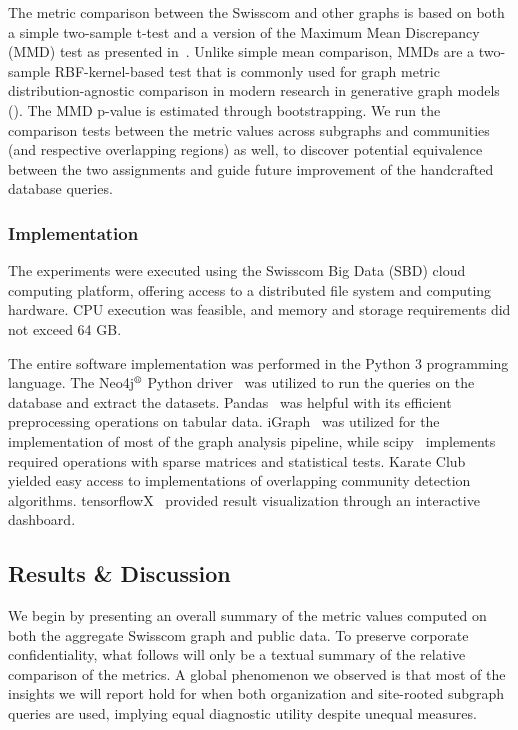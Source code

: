 The metric comparison between the Swisscom and other graphs is based on both a simple two-sample t-test and a version of the Maximum Mean Discrepancy (MMD) test as presented in~\cite{gretton_kernel_2012}. Unlike simple mean comparison, MMDs are a two-sample RBF-kernel-based test that is commonly used for graph metric distribution-agnostic comparison in modern research in generative graph models (\cite{you_graphrnn_2018, krawczuk_gg-gan_2020}). The MMD p-value is estimated through bootstrapping. We run the comparison tests between the metric values across subgraphs and communities (and respective overlapping regions) as well, to discover potential equivalence between the two assignments and guide future improvement of the handcrafted database queries.


\subsubsection{Implementation}
The experiments were executed using the Swisscom Big Data (SBD) cloud computing platform, offering access to a distributed file system and computing hardware. CPU execution was feasible, and memory and storage requirements did not exceed 64 GB.

The entire software implementation was performed in the Python 3 programming language. The Neo4j$\textsuperscript{\textregistered}$ Python driver~\cite{neo4j_inc_neo4j_2022} was utilized to run the queries on the database and extract the datasets. Pandas~\cite{mckinney_data_2010} was helpful with its efficient preprocessing operations on tabular data. iGraph~\cite{csardi_igraph_2005} was utilized for the implementation of most of the graph analysis pipeline, while scipy~\cite{virtanen_scipy_2020} implements required operations with sparse matrices and statistical tests. Karate Club~\cite{rozemberczki_karate_2020} yielded easy access to implementations of overlapping community detection algorithms. tensorflowX~\cite{huang_tensorboardx_2022} provided result visualization through an interactive dashboard.

\subsection{Results \& Discussion}
\label{sec:results_swisscom}

We begin by presenting an overall summary of the metric values computed on both the aggregate Swisscom graph and public data. To preserve corporate confidentiality, what follows will only be a textual summary of the relative comparison of the metrics. A global phenomenon we observed is that most of the insights we will report hold for when both organization and site-rooted subgraph queries are used, implying equal diagnostic utility despite unequal measures. 

